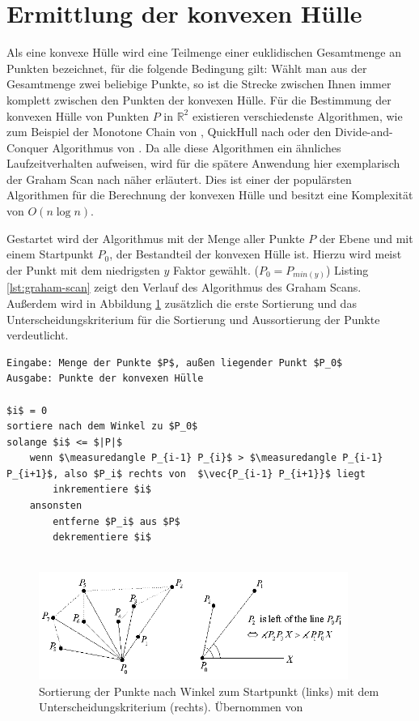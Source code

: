 \section{Ermittlung der konvexen Hülle}

Als eine konvexe Hülle wird eine Teilmenge einer euklidischen Gesamtmenge an Punkten bezeichnet, für die folgende Bedingung gilt: Wählt man aus der Gesamtmenge zwei beliebige Punkte, so ist die Strecke zwischen Ihnen immer komplett zwischen den Punkten der konvexen Hülle. Für die Bestimmung der konvexen Hülle von Punkten \(P\) in \( \mathbb{R}^2\) existieren verschiedenste Algorithmen, wie zum Beispiel der Monotone Chain von \citet{andrew1979another}, QuickHull nach \citet{eddy1977new} oder den Divide-and-Conquer Algorithmus von \citet{preparata1985convex}. Da alle diese Algorithmen ein ähnliches Laufzeitverhalten aufweisen, wird für die spätere Anwendung hier exemplarisch der Graham Scan nach \citet{graham1972efficient} näher erläutert. Dies ist einer der populärsten Algorithmen für die Berechnung der konvexen Hülle und besitzt eine Komplexität von \(O(n \log n)\).

Gestartet wird der Algorithmus mit der Menge aller Punkte \(P\) der Ebene und mit einem Startpunkt \(P_0\), der Bestandteil der konvexen Hülle ist. Hierzu wird meist der Punkt mit dem niedrigsten \(y\) Faktor gewählt. (\(P_0=P_{min(y)}\)) Listing \ref{lst:graham-scan} zeigt den Verlauf des Algorithmus des Graham Scans. Außerdem wird in Abbildung \ref{fig:convexhull} zusätzlich die erste Sortierung und das Unterscheidungskriterium für die Sortierung und Aussortierung der Punkte verdeutlicht. \citep{convexHull} 


\begin{lstlisting}[mathescape,caption=Graham Scan Algorithmus, label=lst:graham-scan, float=htbp]
Eingabe: Menge der Punkte $P$, außen liegender Punkt $P_0$
Ausgabe: Punkte der konvexen Hülle

$i$ = 0
sortiere nach dem Winkel zu $P_0$
solange $i$ <= $|P|$
    wenn $\measuredangle P_{i-1} P_{i}$ > $\measuredangle P_{i-1} P_{i+1}$, also $P_i$ rechts von  $\vec{P_{i-1} P_{i+1}}$ liegt
        inkrementiere $i$
    ansonsten
        entferne $P_i$ aus $P$
        dekrementiere $i$
    
\end{lstlisting} 

\begin{figure}[h]
  \centering
	\includegraphics[width=0.9\textwidth]{content/images/methods/convexhull.png} 
  \caption{Sortierung der Punkte nach Winkel zum Startpunkt (links) mit dem Unterscheidungskriterium (rechts). Übernommen von \citet{convexHull}}
  \label{fig:convexhull}
\end{figure}
